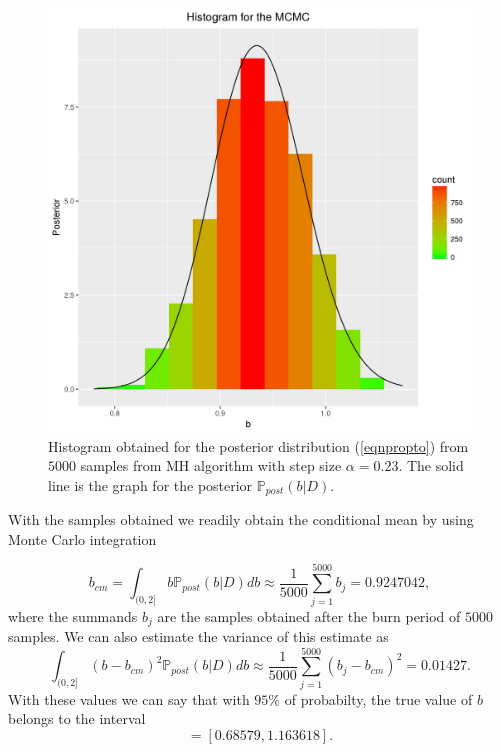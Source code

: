 \documentclass[12pt]{book}
\newcommand{\post}{\mathbb{P}_{post}}
\begin{document}
%


\begin{figure}[H]
\centering
\includegraphics[scale=0.8]{./FigChap3/histogram_mcmc.jpg}
\caption{Histogram obtained for the posterior distribution (\ref{eqnpropto}) 
from $5000$ samples from MH algorithm with step size $\alpha=0.23$. The solid line
is the  graph for the posterior $\post(b|D)$.}
\end{figure}

With the samples obtained we readily obtain the conditional mean  by using Monte Carlo integration

\begin{equation}\label{eqnbcmMC}
b_{cm}=\int_{(0,2]}b\post(b|D)db\approx\frac{1}{5000}\sum_{j=1}^{5000}b_{j}=0.9247042,
\end{equation}
where the summands $b_{j}$ are the samples obtained after the burn period of $5000$ samples. We can 
also estimate the variance of this estimate as 
\begin{equation*}
\int_{(0,2]}(b-b_{cm})^{2}\post(b|D)db\approx\frac{1}{5000}\sum_{j=1}^{5000}(b_{j}-b_{cm})^{2}=0.01427.
\end{equation*}
With these values we can say that with $95\%$ of probabilty, the true value of $b$ belongs to the
interval
\begin{equation*}
[0.9247042-2\sqrt{0.01427},0.92470422+2\sqrt{0.01427}]=[0.68579,1.163618].
\end{equation*}
\end{document}

